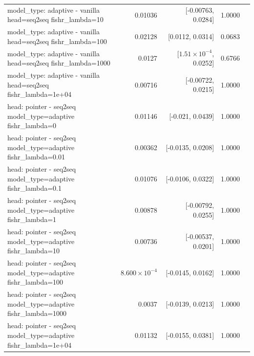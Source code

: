 \documentclass[10pt]{article}
\makeatletter
\newcommand{\stackcell}[1]{\begin{tabular}[t]{@{}l@{}}#1\end{tabular}}
\makeatother
\begin{document}
{\begin{longtable}{lrrrl}
\stackcell{model\_type: adaptive - vanilla\\\footnotesize head=seq2seq fishr\_lambda=10 } & 0.01036 & [-0.00763, 0.0284] & 1.0000 & \\
\stackcell{model\_type: adaptive - vanilla\\\footnotesize head=seq2seq fishr\_lambda=100 } & 0.02128 & [0.0112, 0.0314] & 0.0683 & \\
\stackcell{model\_type: adaptive - vanilla\\\footnotesize head=seq2seq fishr\_lambda=1000 } & 0.0127 & [$1.51\times10^{-4}$, 0.0252] & 0.6766 & \\
\stackcell{model\_type: adaptive - vanilla\\\footnotesize head=seq2seq fishr\_lambda=1e+04 } & 0.00716 & [-0.00722, 0.0215] & 1.0000 & \\
\stackcell{head: pointer - seq2seq\\\footnotesize model\_type=adaptive fishr\_lambda=0 } & 0.01146 & [-0.021, 0.0439] & 1.0000 & \\
\stackcell{head: pointer - seq2seq\\\footnotesize model\_type=adaptive fishr\_lambda=0.01 } & 0.00362 & [-0.0135, 0.0208] & 1.0000 & \\
\stackcell{head: pointer - seq2seq\\\footnotesize model\_type=adaptive fishr\_lambda=0.1 } & 0.01076 & [-0.0106, 0.0322] & 1.0000 & \\
\stackcell{head: pointer - seq2seq\\\footnotesize model\_type=adaptive fishr\_lambda=1 } & 0.00878 & [-0.00792, 0.0255] & 1.0000 & \\
\stackcell{head: pointer - seq2seq\\\footnotesize model\_type=adaptive fishr\_lambda=10 } & 0.00736 & [-0.00537, 0.0201] & 1.0000 & \\
\stackcell{head: pointer - seq2seq\\\footnotesize model\_type=adaptive fishr\_lambda=100 } & $8.600\times10^{-4}$ & [-0.0145, 0.0162] & 1.0000 & \\
\stackcell{head: pointer - seq2seq\\\footnotesize model\_type=adaptive fishr\_lambda=1000 } & 0.0037 & [-0.0139, 0.0213] & 1.0000 & \\
\stackcell{head: pointer - seq2seq\\\footnotesize model\_type=adaptive fishr\_lambda=1e+04 } & 0.01132 & [-0.0155, 0.0381] & 1.0000 & \\

\end{longtable}}
\end{document}

